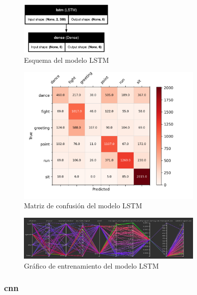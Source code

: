 \begin{figure}[H]
    \centering
    \includegraphics[width=0.4\textwidth]{Imagenes/Bitmap/best-lstm0.8.png}
    \caption{Esquema del modelo LSTM}
    \label{fig:lstm-0.8-ejemplo}
\end{figure}
\begin{figure}[H]
    \centering
    \includegraphics[width=0.8\textwidth]{Imagenes/Bitmap/CM_best-lstm0.8.png}
    \caption{Matriz de confusión del modelo LSTM}
    \label{fig:lstm-0.8-matriz-ejemplo}
\end{figure}
\begin{figure}[H]
    \centering
    \includegraphics[width=0.8\textwidth]{Imagenes/Bitmap/tb-lstm-0.8.png}
    \caption{Gráfico de entrenamiento del modelo LSTM}
    \label{fig:lstm-0.8-grafico-ejemplo}
\end{figure}

\subsubsection{\gls{cnn}}


